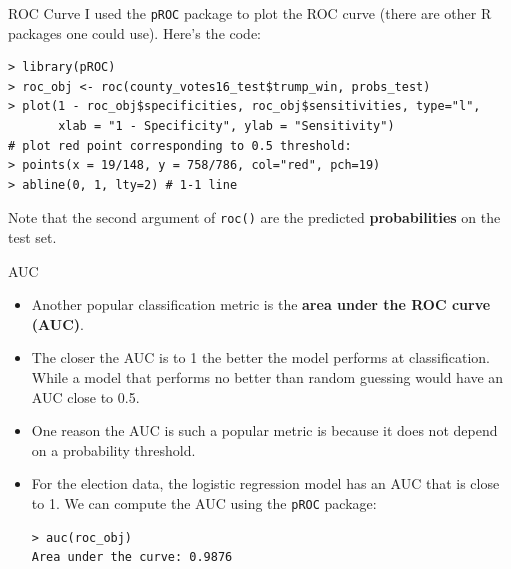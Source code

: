 \documentclass[10pt]{beamer}\usepackage[]{graphicx}\usepackage[]{color}
\begin{document}
\begin{frame}[fragile]{ROC Curve}
I used the \texttt{pROC} package to plot the ROC curve (there are other R packages one could use).  Here's the code:
\small
\begin{verbatim}
> library(pROC)
> roc_obj <- roc(county_votes16_test$trump_win, probs_test)
> plot(1 - roc_obj$specificities, roc_obj$sensitivities, type="l",
       xlab = "1 - Specificity", ylab = "Sensitivity")
# plot red point corresponding to 0.5 threshold:
> points(x = 19/148, y = 758/786, col="red", pch=19) 
> abline(0, 1, lty=2) # 1-1 line
\end{verbatim}
Note that the second argument of \texttt{roc()} are the predicted \textbf{probabilities} on the test set.
\end{frame}

\begin{frame}[fragile]{AUC}
\begin{itemize}
\item Another popular classification metric is the \textbf{area under the ROC curve (AUC)}.  
\vspace{5pt}
\item The closer the AUC is to 1 the better the model performs at classification.  While a model that performs no better than random guessing would have an AUC close to 0.5.
\vspace{5pt}
\item One reason the AUC is such a popular metric is because it does not depend on a probability threshold.
\vspace{5pt}
\item For the election data, the logistic regression model has an AUC that is close to 1.  We can compute the AUC using the \texttt{pROC} package:
\begin{verbatim}
> auc(roc_obj)
Area under the curve: 0.9876
\end{verbatim}
\end{itemize}
\end{frame}
\end{document}
